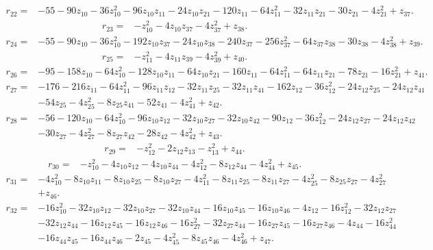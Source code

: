 \begin{align*}
 r_{22}={}&-55-90z_{10}-36z_{10}^{2}-96z_{10}z_{11}-24z_{10}z_{21}-120z_{11}-64z_{11}^{2}-32z_{11}z_{21}-30z_{21}-4z_{21}^{2}+z_{37} .
\end{align*}
\begin{align*}
 r_{23}={}&-z_{10}^{2}-4z_{10}z_{37}-4z_{37}^{2}+z_{38} .
\end{align*}
\begin{align*}
 r_{24}={}&-55-90z_{10}-36z_{10}^{2}-192z_{10}z_{37}-24z_{10}z_{38}-240z_{37}-256z_{37}^{2}-64z_{37}z_{38}-30z_{38}-4z_{38}^{2}+z_{39} .
\end{align*}
\begin{align*}
 r_{25}={}&-z_{11}^{2}-4z_{11}z_{39}-4z_{39}^{2}+z_{40} .
\end{align*}
\begin{align*}
 r_{26}={}&-95-158z_{10}-64z_{10}^{2}-128z_{10}z_{11}-64z_{10}z_{21}-160z_{11}-64z_{11}^{2}-64z_{11}z_{21}-78z_{21}-16z_{21}^{2}+z_{41} .
\end{align*}
\begin{align*}
 r_{27}={}&-176-216z_{11}-64z_{11}^{2}-96z_{11}z_{12}-32z_{11}z_{25}-32z_{11}z_{41}-162z_{12}-36z_{12}^{2}-24z_{12}z_{25}-24z_{12}z_{41}\\
 &-54z_{25}-4z_{25}^{2}-8z_{25}z_{41}-52z_{41}-4z_{41}^{2}+z_{42} .
\end{align*}
\begin{align*}
 r_{28}={}&-56-120z_{10}-64z_{10}^{2}-96z_{10}z_{12}-32z_{10}z_{27}-32z_{10}z_{42}-90z_{12}-36z_{12}^{2}-24z_{12}z_{27}-24z_{12}z_{42}\\
 &-30z_{27}-4z_{27}^{2}-8z_{27}z_{42}-28z_{42}-4z_{42}^{2}+z_{43} .
\end{align*}
\begin{align*}
 r_{29}={}&-z_{12}^{2}-2z_{12}z_{13}-z_{13}^{2}+z_{44} .
\end{align*}
\begin{align*}
 r_{30}={}&-z_{10}^{2}-4z_{10}z_{12}-4z_{10}z_{44}-4z_{12}^{2}-8z_{12}z_{44}-4z_{44}^{2}+z_{45} .
\end{align*}
\begin{align*}
 r_{31}={}&-4z_{10}^{2}-8z_{10}z_{11}-8z_{10}z_{25}-8z_{10}z_{27}-4z_{11}^{2}-8z_{11}z_{25}-8z_{11}z_{27}-4z_{25}^{2}-8z_{25}z_{27}-4z_{27}^{2}\\
 &+z_{46} .
\end{align*}
\begin{align*}
 r_{32}={}&-16z_{10}^{2}-32z_{10}z_{12}-32z_{10}z_{27}-32z_{10}z_{44}-16z_{10}z_{45}-16z_{10}z_{46}-4z_{12}-16z_{12}^{2}-32z_{12}z_{27}\\
 &-32z_{12}z_{44}-16z_{12}z_{45}-16z_{12}z_{46}-16z_{27}^{2}-32z_{27}z_{44}-16z_{27}z_{45}-16z_{27}z_{46}-4z_{44}-16z_{44}^{2}\\
 &-16z_{44}z_{45}-16z_{44}z_{46}-2z_{45}-4z_{45}^{2}-8z_{45}z_{46}-4z_{46}^{2}+z_{47} .
\end{align*}
